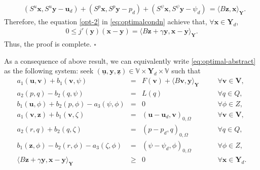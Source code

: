 \documentclass[smallextended]{svjour3}
\renewenvironment{proof}{\noindent{\it Proof.}}{\hfill$\square$}
\numberwithin{equation}{section}
\numberwithin{figure}{section}
\numberwithin{table}{section}
\newcommand\bV{\mathbf{V}}
\newcommand\buu{\underline{\boldsymbol{u}}}
\newcommand\buz{\underline{\boldsymbol{z}}}
\newcommand\bx{\boldsymbol{x}}
\newcommand\by{\boldsymbol{y}}
\newcommand\bu{\boldsymbol{u}}
\newcommand\bv{\boldsymbol{v}}
\newcommand\bz{\boldsymbol{z}}
\newcommand{\bYd}{\boldsymbol{Y}_d}
\newcommand{\bY}{\boldsymbol{Y}}
\newcommand{\bbV}{\mathbb{V}}
\begin{document}
\begin{proof}
		\begin{equation}\label{opt-2}
			\begin{aligned}
				&(S^u \bx, S^u \by - \bu_d) + (S^p \bx, S^p \by - p_d)  + (S^\psi \bx, S^\psi \by - \psi_d) 
				 \,=  \langle B \bz, \bx \rangle_{\bY}.
			\end{aligned}
		\end{equation}
		Therefore, the equation \eqref{opt-2} in \eqref{eq:optimalcondn} achieve that, $\forall \bx \in \bYd$,
		\begin{align*}
				0 \le j'(\by)(\bx - \by)  = \langle B \bz + \gamma \by, \bx - \by \rangle_{\bY}.
		\end{align*}
        Thus, the proof is complete.
	\end{proof}

    \bigskip
    As a consequence of above result, we can equivalently write \eqref{eq:optimal-abstract} as the following system:
	seek $(\buu, \by, \buz) \in \bbV \times \bYd\times \bbV $ 
	such that
	\begin{subequations} \label{eq:weak-optimalcontrol}
		\begin{alignat}{6}
			a_1(\bu, \bv)   +  b_1(\bv, \psi) &= & F(\bv) + \langle B \bv, \by \rangle_{\bY}  & \quad & \forall \bv \in \bV, \\
			a_2(p,q)    -    b_2(q,\psi) & = & L(q)  \qquad \quad & \quad & \forall q \in Q, \\
			b_1(\bu, \phi)  + b_2(p,\phi)  - a_3(\psi, \phi) & =& 0  \qquad \qquad& \quad & \forall \phi \in Z,\\
			a_1(\bv, \bz) +  b_1(\bv, \zeta)     &=& (\bu - \bu_d, \bv)_{0, \Omega} \,  &\quad&\forall \bv \in \bV,\\
			a_2(r,q)   +    b_2(q,\zeta)  &=&( p - p_d, q)_{0, \Omega} \, &\quad&\forall q \in Q,  \\
			b_1(\bz, \phi)    -  b_2(r,\phi) - a_3(\zeta, \phi)  &=& (\psi- \psi_d, \phi)_{0, \Omega} \,  &\quad&\forall \phi \in Z, \\
			\langle B \bz + \gamma \by, \bx - \by \rangle_{\bY} &\ge& 0 \qquad \qquad&\quad& \forall \bx \in \bYd.
	\end{alignat}
\end{subequations}
\end{document}
